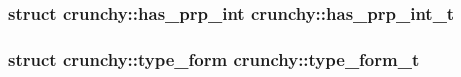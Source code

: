 \subsubsection[{has\+\_\+prp\+\_\+int\+\_\+t}]{\setlength{\rightskip}{0pt plus 5cm}struct {\bf crunchy\+::has\+\_\+prp\+\_\+int}  crunchy\+::has\+\_\+prp\+\_\+int\+\_\+t}\hypertarget{namespacecrunchy_af87c811f546c4e2e1286afbd8b7f8214}{}\label{namespacecrunchy_af87c811f546c4e2e1286afbd8b7f8214}
\subsubsection[{type\+\_\+form\+\_\+t}]{\setlength{\rightskip}{0pt plus 5cm}struct {\bf crunchy\+::type\+\_\+form}  crunchy\+::type\+\_\+form\+\_\+t}\hypertarget{namespacecrunchy_a485eab134ce624b5c2330b623928030f}{}\label{namespacecrunchy_a485eab134ce624b5c2330b623928030f}
